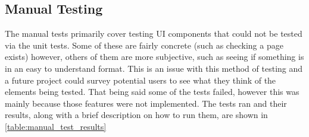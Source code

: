 \documentclass{UoYCSproject}
\begin{document}
\subsection{Manual Testing}
The manual tests primarily cover testing UI components that could not be tested via the unit tests. Some of these are fairly concrete (such as checking a page exists) however, others of them are more subjective, such as seeing if something is in an easy to understand format. This is an issue with this method of testing and a future project could survey potential users to see what they think of the elements being tested. That being said some of the tests failed, however this was mainly because those features were not implemented. The tests ran and their results, along with a brief description on how to run them, are shown in \ref{table:manual_test_results}
\end{document}
